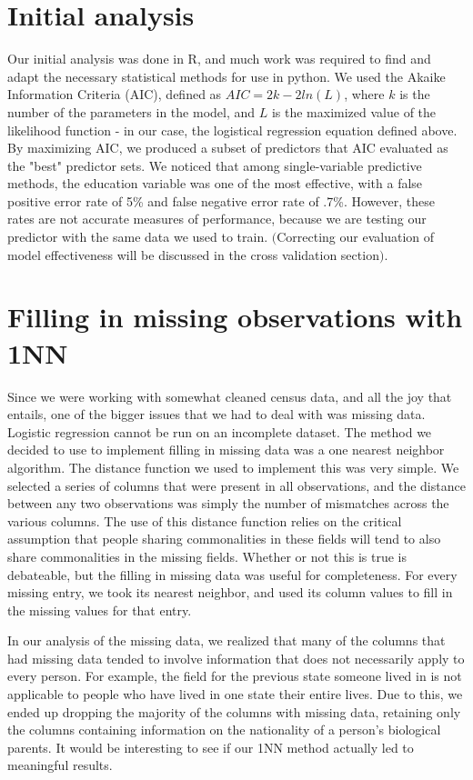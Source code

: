 \documentclass[11pt]{article}
\begin{document}
\section{Initial analysis}
Our initial analysis was done in R, and much work was required to find and adapt the necessary statistical methods for use in python. 
We used the Akaike Information Criteria (AIC), defined as $AIC = 2k - 2ln(L)$, where $k$ is the number of the parameters in the model, and $L$ is the maximized value of the likelihood function - in our case, the logistical regression equation defined above. By maximizing AIC, we produced a subset of predictors that AIC evaluated as the "best" predictor sets. We noticed that among single-variable predictive methods, the education variable was one of the most effective, with a false positive error rate of 5\% and false negative error rate of .7\%. However, these rates are not accurate measures of performance, because we are testing our predictor with the same data we used to train. $($Correcting our evaluation of model effectiveness will be discussed in the cross validation section$)$.

\section{Filling in missing observations with 1NN}
Since we were working with somewhat cleaned census data, and all the joy that entails, one of the bigger issues that we had to deal with was missing data. Logistic regression cannot be run on an incomplete dataset. The method we decided to use to implement filling in missing data was a one nearest neighbor algorithm. The distance function we used to implement this was very simple. We selected a series of columns that were present in all observations, and the distance between any two observations was simply the number of mismatches across the various columns. The use of this distance function relies on the critical assumption that people sharing commonalities in these fields will tend to also share commonalities in the missing fields. Whether or not this is true is debateable, but the filling in missing data was useful for completeness. For every missing entry, we took its nearest neighbor, and used its column values to fill in the missing values for that entry.

In our analysis of the missing data, we realized that many of the columns that had missing data tended to involve information that does not necessarily apply to every person. For example, the field for the previous state someone lived in is not applicable to people who have lived in one state their entire lives. Due to this, we ended up dropping the majority of the columns with missing data, retaining only the columns containing information on the nationality of a person's biological parents. It would be interesting to see if our 1NN method actually led to meaningful results.
\end{document}
